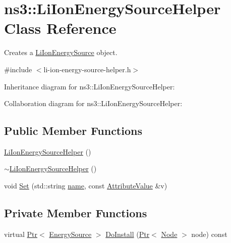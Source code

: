 \hypertarget{classns3_1_1LiIonEnergySourceHelper}{}\section{ns3\+:\+:Li\+Ion\+Energy\+Source\+Helper Class Reference}
\label{classns3_1_1LiIonEnergySourceHelper}


Creates a \hyperlink{classns3_1_1LiIonEnergySource}{Li\+Ion\+Energy\+Source} object.  




{\ttfamily \#include $<$li-\/ion-\/energy-\/source-\/helper.\+h$>$}



Inheritance diagram for ns3\+:\+:Li\+Ion\+Energy\+Source\+Helper\+:


Collaboration diagram for ns3\+:\+:Li\+Ion\+Energy\+Source\+Helper\+:
\subsection*{Public Member Functions}
\begin{DoxyCompactItemize}
\item 
\hyperlink{classns3_1_1LiIonEnergySourceHelper_ad62dbd2508a1d4966ade4c03b0d8537a}{Li\+Ion\+Energy\+Source\+Helper} ()
\item 
\hyperlink{classns3_1_1LiIonEnergySourceHelper_a21ec3623e56baee6bbaa72dd9ae10735}{$\sim$\+Li\+Ion\+Energy\+Source\+Helper} ()
\item 
void \hyperlink{classns3_1_1LiIonEnergySourceHelper_aa77159f3a1d5e4595dac6047d0b64502}{Set} (std\+::string \hyperlink{generate__test__data__lte__spectrum__model_8m_ab74e6bf80237ddc4109968cedc58c151}{name}, const \hyperlink{classns3_1_1AttributeValue}{Attribute\+Value} \&v)
\end{DoxyCompactItemize}
\subsection*{Private Member Functions}
\begin{DoxyCompactItemize}
\item 
virtual \hyperlink{classns3_1_1Ptr}{Ptr}$<$ \hyperlink{classns3_1_1EnergySource}{Energy\+Source} $>$ \hyperlink{classns3_1_1LiIonEnergySourceHelper_a7ffdcf165c662ba803efb41a52988823}{Do\+Install} (\hyperlink{classns3_1_1Ptr}{Ptr}$<$ \hyperlink{classns3_1_1Node}{Node} $>$ node) const 
\end{DoxyCompactItemize}
